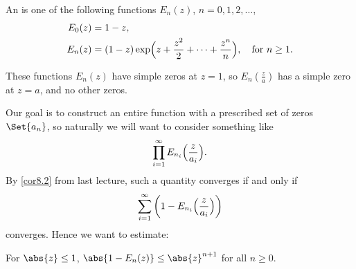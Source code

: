 


\begin{definition}
	An  is one of the following functions $E_n(z)$, $n = 0, 1, 2, \dots$,
	\begin{align*}
		E_0(z) &= 1 - z, \\
		E_n(z) &= (1 - z) \exp\Bigl (z + \frac{z^2}{2} + \dots + \frac{z^n}{n} \Bigr ), \quad \text{for $n \geq 1$}.
	\end{align*}
\end{definition}

\begin{remark}
	These functions $E_n(z)$ have simple zeros at $z = 1$, so $E_n(\frac{z}{a})$ has a simple zero at $z = a$, and no other zeros.
\end{remark}

Our goal is to construct an entire function with a prescribed set of zeros $\Set{a_n}$, so naturally we will want to consider something like
\[
	\prod_{i = 1}^\infty E_{n_i} \Bigl ( \frac{z}{a_i} \Bigr ).
\]
By \autoref{cor8.2} from last lecture, such a quantity converges if and only if
\[
	\sum_{i = 1}^\infty \left ( 1 - E_{n_i} \Bigl(\frac{z}{a_i} \Bigr) \right )
\]
converges.
Hence we want to estimate:

\begin{lemma}\label{lem8.6}
	For $\abs{z} \leq 1$, $\abs{1 - E_n(z)} \leq \abs{z}^{n + 1}$ for all $n \geq 0$.
\end{lemma}

